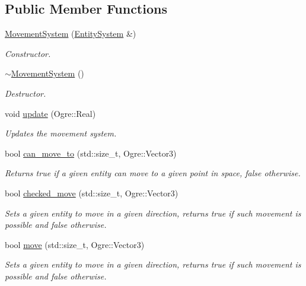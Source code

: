 \subsection*{Public Member Functions}
\begin{DoxyCompactItemize}
\item 
\hyperlink{class_movement_system_ac79c2f7549bf24bb08b020e4bd0928a0}{Movement\+System} (\hyperlink{class_entity_system}{Entity\+System} \&)
\begin{DoxyCompactList}\small\item\em Constructor. \end{DoxyCompactList}\item 
\hyperlink{class_movement_system_a7389ab211f0da0cf859570d23ffb70fa}{$\sim$\+Movement\+System} ()
\begin{DoxyCompactList}\small\item\em Destructor. \end{DoxyCompactList}\item 
void \hyperlink{class_movement_system_a005915a7fff5eaf8f1e644e07ccda9e4}{update} (Ogre\+::\+Real)
\begin{DoxyCompactList}\small\item\em Updates the movement system. \end{DoxyCompactList}\item 
bool \hyperlink{class_movement_system_ae986dc2fb886b40fac2ab97a1c21d934}{can\+\_\+move\+\_\+to} (std\+::size\+\_\+t, Ogre\+::\+Vector3)
\begin{DoxyCompactList}\small\item\em Returns true if a given entity can move to a given point in space, false otherwise. \end{DoxyCompactList}\item 
bool \hyperlink{class_movement_system_a223e95da80379c936d01790ca449a0de}{checked\+\_\+move} (std\+::size\+\_\+t, Ogre\+::\+Vector3)
\begin{DoxyCompactList}\small\item\em Sets a given entity to move in a given direction, returns true if such movement is possible and false otherwise. \end{DoxyCompactList}\item 
bool \hyperlink{class_movement_system_a7cd808c936ad925fc5b15d76e9d52afd}{move} (std\+::size\+\_\+t, Ogre\+::\+Vector3)
\begin{DoxyCompactList}\small\item\em Sets a given entity to move in a given direction, returns true if such movement is possible and false otherwise. \end{DoxyCompactList}\end{DoxyCompactItemize}
